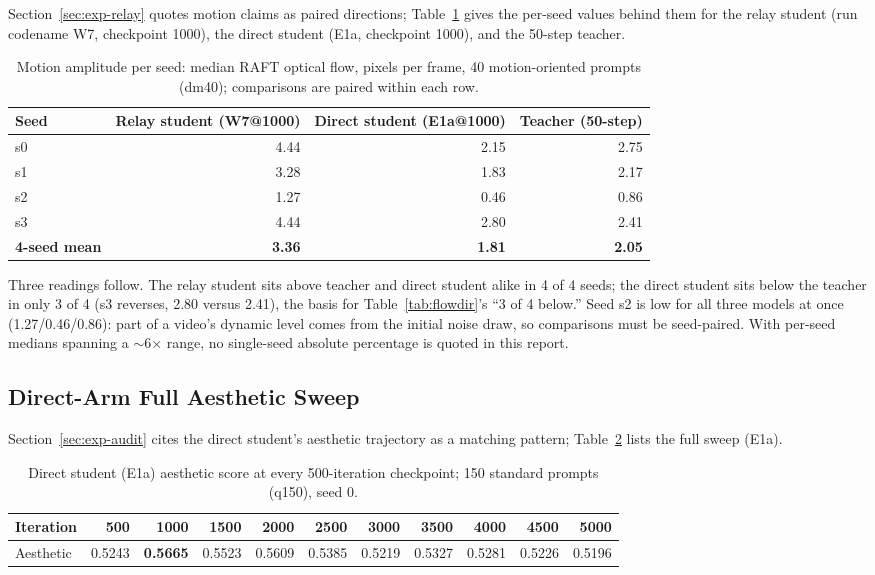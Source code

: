 \documentclass[11pt,a4paper]{article}
\begin{document}
Section~\ref{sec:exp-relay} quotes motion claims as paired directions; Table~\ref{tab:flow-seeds} gives the per-seed values behind them for the relay student (run codename W7, checkpoint 1000), the direct student (E1a, checkpoint 1000), and the 50-step teacher.

\begin{table}[htbp]
  \centering
  \setlength{\tabcolsep}{5pt}
  \begin{tabular}{lrrr}
    \toprule
    Seed & Relay student (W7@1000) & Direct student (E1a@1000) & Teacher (50-step) \\
    \midrule
    s0 & 4.44 & 2.15 & 2.75 \\
    s1 & 3.28 & 1.83 & 2.17 \\
    s2 & 1.27 & 0.46 & 0.86 \\
    s3 & 4.44 & 2.80 & 2.41 \\
    \textbf{4-seed mean} & \textbf{3.36} & \textbf{1.81} & \textbf{2.05} \\
    \bottomrule
  \end{tabular}
  \caption{Motion amplitude per seed: median RAFT optical flow, pixels per frame, 40 motion-oriented prompts (dm40); comparisons are paired within each row.}
  \label{tab:flow-seeds}
\end{table}

Three readings follow. The relay student sits above teacher and direct student alike in 4 of 4 seeds; the direct student sits below the teacher in only 3 of 4 (s3 reverses, 2.80 versus 2.41), the basis for Table~\ref{tab:flowdir}'s ``3 of 4 below.'' Seed s2 is low for all three models at once (1.27/0.46/0.86): part of a video's dynamic level comes from the initial noise draw, so comparisons must be seed-paired. With per-seed medians spanning a $\sim$6$\times$ range, no single-seed absolute percentage is quoted in this report.

\subsection{Direct-Arm Full Aesthetic Sweep}\label{sec:app-sweep}

Section~\ref{sec:exp-audit} cites the direct student's aesthetic trajectory as a matching pattern; Table~\ref{tab:aes-sweep} lists the full sweep (E1a).

\begin{table}[htbp]
  \centering
  \small
  \setlength{\tabcolsep}{4pt}
  \begin{tabular}{lrrrrrrrrrr}
    \toprule
    Iteration & 500 & 1000 & 1500 & 2000 & 2500 & 3000 & 3500 & 4000 & 4500 & 5000 \\
    \midrule
    Aesthetic & 0.5243 & \textbf{0.5665} & 0.5523 & 0.5609 & 0.5385 & 0.5219 & 0.5327 & 0.5281 & 0.5226 & 0.5196 \\
    \bottomrule
  \end{tabular}
  \caption{Direct student (E1a) aesthetic score at every 500-iteration checkpoint; 150 standard prompts (q150), seed 0.}
  \label{tab:aes-sweep}
\end{table}
\end{document}
